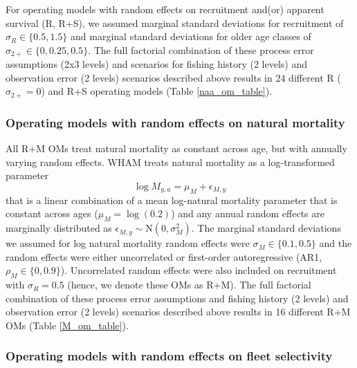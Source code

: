 \documentclass[
  12pt,
]{article}
\begin{document}
For operating models with random effects on recruitment and(or) apparent
survival (R, R+S), we assumed marginal standard deviations for
recruitment of \(\sigma_R \in \{0.5,1.5\}\) and marginal standard
deviations for older age classes of \(\sigma_{2+} \in \{0,0.25, 0.5\}\).
The full factorial combination of these process error assumptions (2x3
levels) and scenarios for fishing history (2 levels) and observation
error (2 levels) scenarios described above results in 24 different R
(\(\sigma_{2+} = 0\)) and R+S operating models (Table
\ref{naa_om_table}).

\subsubsection*{Operating models with random effects on natural
mortality}\label{operating-models-with-random-effects-on-natural-mortality}

All R+M OMs treat natural mortality as constant across age, but with
annually varying random effects. WHAM treats natural mortality as a
log-transformed parameter \[
\log M_{y,a} = \mu_{M} + \epsilon_{M,y}
\] that is a linear combination of a mean log-natural mortality
parameter that is constant across ages (\(\mu_{M} = \log(0.2)\)) and any
annual random effects are marginally distributed as
\(\epsilon_{M,y} \sim \text{N}\left(0,\sigma_M^2\right)\). The marginal
standard deviations we assumed for log natural mortality random effects
were \(\sigma_M \in \{0.1, 0.5\}\) and the random effects were either
uncorrelated or first-order autoregressive (AR1,
\(\rho_M \in \{0,0.9\}\)). Uncorrelated random effects were also
included on recruitment with \(\sigma_R = 0.5\) (hence, we denote these
OMs as R+M). The full factorial combination of these process error
assumptions and fishing history (2 levels) and observation error (2
levels) scenarios described above results in 16 different R+M OMs (Table
\ref{M_om_table}).

\subsubsection*{Operating models with random effects on fleet
selectivity}\label{operating-models-with-random-effects-on-fleet-selectivity}
\end{document}
